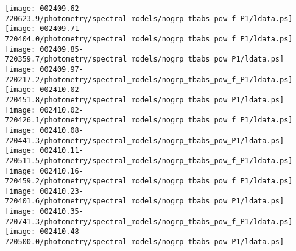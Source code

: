 \documentclass{aastex}
\begin{document}
\begin{figure*}[!ht]
\centering
\texttt{[image: 002409.62-720623.9/photometry/spectral\_models/nogrp\_tbabs\_pow\_f\_P1/ldata.ps]} \hfill 
\texttt{[image: 002409.71-720404.0/photometry/spectral\_models/nogrp\_tbabs\_pow\_f\_P1/ldata.ps]} \hfill 
\texttt{[image: 002409.85-720359.7/photometry/spectral\_models/nogrp\_tbabs\_pow\_P1/ldata.ps]} \\ 
\vspace*{0.5in}
\texttt{[image: 002409.97-720217.2/photometry/spectral\_models/nogrp\_tbabs\_pow\_f\_P1/ldata.ps]} \hfill 
\texttt{[image: 002410.02-720451.8/photometry/spectral\_models/nogrp\_tbabs\_pow\_P1/ldata.ps]} \hfill 
\texttt{[image: 002410.02-720426.1/photometry/spectral\_models/nogrp\_tbabs\_pow\_f\_P1/ldata.ps]} \\ 
\vspace*{0.5in}
\texttt{[image: 002410.08-720441.3/photometry/spectral\_models/nogrp\_tbabs\_pow\_P1/ldata.ps]} \hfill 
\texttt{[image: 002410.11-720511.5/photometry/spectral\_models/nogrp\_tbabs\_pow\_f\_P1/ldata.ps]} \hfill 
\texttt{[image: 002410.16-720459.2/photometry/spectral\_models/nogrp\_tbabs\_pow\_f\_P1/ldata.ps]} \\ 
\vspace*{0.5in}
\texttt{[image: 002410.23-720401.6/photometry/spectral\_models/nogrp\_tbabs\_pow\_P1/ldata.ps]} \hfill 
\texttt{[image: 002410.35-720741.3/photometry/spectral\_models/nogrp\_tbabs\_pow\_f\_P1/ldata.ps]} \hfill 
\texttt{[image: 002410.48-720500.0/photometry/spectral\_models/nogrp\_tbabs\_pow\_P1/ldata.ps]} \\ 
\vspace*{0.5in}
\end{figure*}
\clearpage
\end{document}
